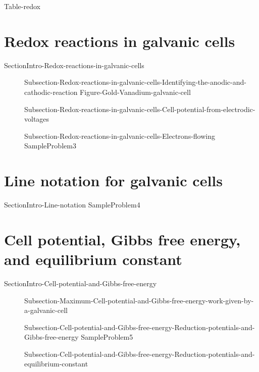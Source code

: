 \documentclass[main.tex]{subfiles}
\begin{document}
{Table-redox} 


\section{Redox reactions in galvanic cells}{SectionIntro-Redox-reactions-in-galvanic-cells} 
\sloppy\begin{description}
\item[]{Subsection-Redox-reactions-in-galvanic-cells-Identifying-the-anodic-and-cathodic-reaction}
 {Figure-Gold-Vanadium-galvanic-cell}
  \item[]{Subsection-Redox-reactions-in-galvanic-cells-Cell-potential-from-electrodic-voltages}
   \item[]{Subsection-Redox-reactions-in-galvanic-cells-Electrons-flowing}
 {SampleProblem3}
\end{description}

\section{Line notation for galvanic cells}{SectionIntro-Line-notation}
  {SampleProblem4}



\section{Cell potential, Gibbs free energy, and equilibrium constant}{SectionIntro-Cell-potential-and-Gibbs-free-energy}
\sloppy\begin{description}
 \item[] {Subsection-Maximum-Cell-potential-and-Gibbs-free-energy-work-given-by-a-galvanic-cell}
  \item[] {Subsection-Cell-potential-and-Gibbs-free-energy-Reduction-potentials-and-Gibbs-free-energy}
 {SampleProblem5}
  \item[] {Subsection-Cell-potential-and-Gibbs-free-energy-Reduction-potentials-and-equilibrium-constant}
\end{description}
\end{document}
